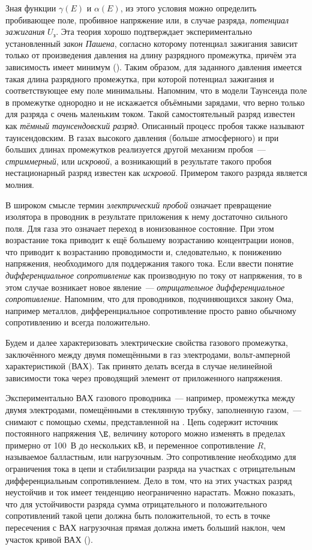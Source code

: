 Зная функции $\gamma(E)$ и $\alpha(E)$, из этого условия можно определить пробивающее поле, пробивное напряжение или, в
случае разряда, \textit{потенциал зажигания} $U_з$. Эта теория хорошо подтверждает экспериментально установленный
\textit{закон Пашена}, согласно которому потенциал зажигания зависит только от произведения давления на длину разрядного
промежутка, причём эта зависимость имеет минимум (). Таким образом, для заданного давления имеется такая длина
разрядного промежутка, при которой потенциал зажигания и соответствующее ему поле минимальны. Напомним, что в модели
Таунсенда поле в промежутке однородно и не искажается объёмными зарядами, что верно только для разряда с очень маленьким
током. Такой самостоятельный разряд известен как \textit{тёмный таунсендовский разряд}. Описанный процесс пробоя также
называют таунсендовским. В газах высокого давления (больше атмосферного) и при больших длинах промежутков реализуется
другой механизм пробоя~--- \textit{стриммерный}, или \textit{искровой}, а возникающий в результате такого пробоя
нестационарный разряд известен как \textit{искровой}. Примером такого разряда является молния.

В широком смысле термин \textit{электрический пробой} означает превращение изолятора в проводник в результате приложения к
нему достаточно сильного поля. Для газа это означает переход в ионизованное состояние. При этом возрастание тока
приводит к ещё большему возрастанию концентрации ионов, что приводит к возрастанию проводимости и, следовательно, к
понижению напряжения, необходимого для поддержания такого тока. Если ввести понятие \textit{дифференциальное
сопротивление} как производную по току от напряжения, то в этом случае возникает новое явление~--- \textit{отрицательное
дифференциальное сопротивление}. Напомним, что для проводников, подчиняющихся закону Ома, например металлов,
дифференциальное сопротивление просто равно обычному сопротивлению и всегда положительно.

Будем и далее характеризовать электрические свойства газового промежутка, заключённого между двумя помещёнными в газ
электродами, вольт-амперной характеристикой (ВАХ). Так принято делать всегда в случае нелинейной зависимости тока через
проводящий элемент от приложенного напряжения.

Экспериментально ВАХ газового проводника~--- например, промежутка между двумя электродами, помещёнными в стеклянную
трубку, заполненную газом,~--- снимают с помощью схемы, представленной на . Цепь содержит источник постоянного
напряжения $\E$, величину которого можно изменять в пределах примерно от 100~В до нескольких кВ, и переменное
сопротивление $R$, называемое балластным, или нагрузочным. Это сопротивление необходимо для ограничения тока в цепи и
стабилизации разряда на участках с отрицательным дифференциальным сопротивлением. Дело в том, что на этих участках
разряд неустойчив и ток имеет тенденцию неограниченно нарастать. Можно показать, что для устойчивости разряда сумма
отрицательного и положительного сопротивлений такой цепи должна быть положительной, то есть в точке пересечения с ВАХ
нагрузочная прямая должна иметь больший наклон, чем участок кривой ВАХ ().

